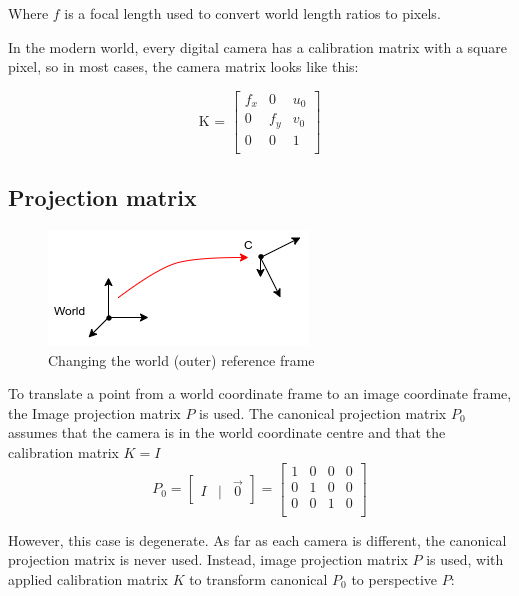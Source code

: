 Where $f$ is a focal length used to convert world length ratios to pixels.

In the modern world, every digital camera has a calibration matrix with a square pixel, so in most cases, the camera matrix looks like this:

\begin{equation}
    \label{eq:kmat}
    \textrm{K = }\begin{bmatrix}
        f_x & 0 & u_0 \\
        0 & f_y & v_0 \\
        0 & 0 & 1 \\
    \end{bmatrix}    
\end{equation}

\subsection{Projection matrix}

\begin{figure}[h]
    \centering
    \includegraphics[width=.5\textwidth]{graphics/frames.png}
    \caption{Changing the world (outer) reference frame}
    \label{fig:frames}
\end{figure}

To translate a point from a world coordinate frame to an image coordinate frame, the Image projection matrix $P$ is used. 
The canonical projection matrix $P_0$ assumes that the camera is in the world coordinate centre and that the calibration matrix $K = I$
\begin{equation}
P_0 = \begin{bmatrix} I & | & \vec{0} \end{bmatrix} = 
    \begin{bmatrix}
    1 & 0 & 0 & 0 \\
    0 & 1 & 0 & 0 \\
    0 & 0 & 1 & 0 \\
    \end{bmatrix}    
\end{equation}

However, this case is degenerate. 
As far as each camera is different, the canonical projection matrix is never used. Instead, image projection matrix $P$ is used, with applied calibration matrix $K$ to transform canonical $P_0$ to perspective $P$:

